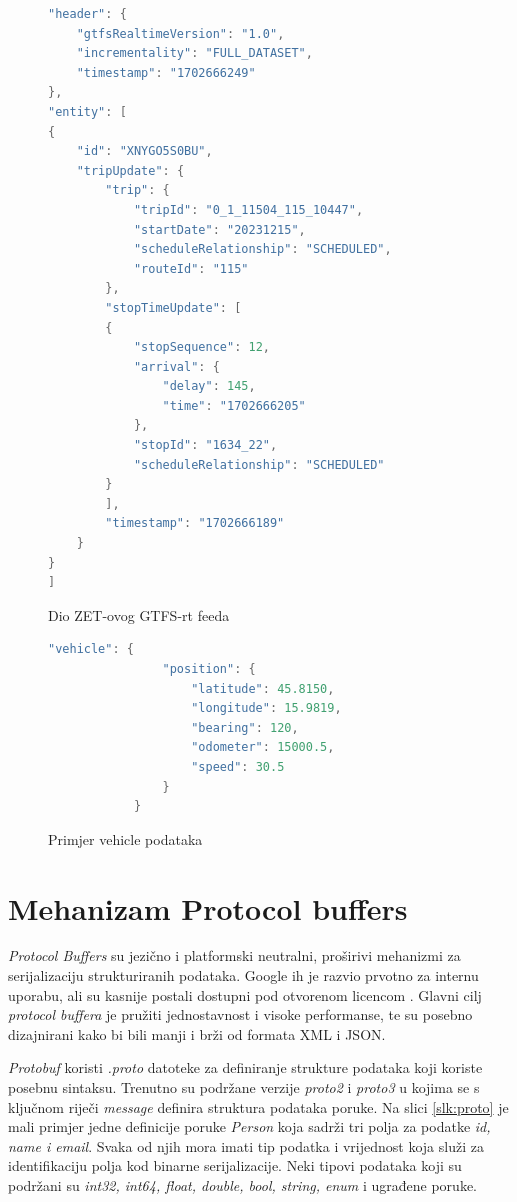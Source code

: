 \documentclass[zavrsnirad]{fer}
\begin{document}
\begin{figure}[H]
	\centering
	

	\begin{minipage}[htb]{0.58\linewidth}
		\centering
		
		\begin{lstlisting}[language=Java]
"header": {
	"gtfsRealtimeVersion": "1.0",
	"incrementality": "FULL_DATASET",
	"timestamp": "1702666249"
},
"entity": [
{
	"id": "XNYGO5S0BU",
	"tripUpdate": {
		"trip": {
			"tripId": "0_1_11504_115_10447",
			"startDate": "20231215",
			"scheduleRelationship": "SCHEDULED",
			"routeId": "115"
		},
		"stopTimeUpdate": [
		{
			"stopSequence": 12,
			"arrival": {
				"delay": 145,
				"time": "1702666205"
			},
			"stopId": "1634_22",
			"scheduleRelationship": "SCHEDULED"
		}
		],
		"timestamp": "1702666189"
	}
}
]
		\end{lstlisting} 
		\caption{Dio ZET-ovog GTFS-rt feeda}
		\label{slk:reply1}
	\end{minipage}
	\hfill
	\begin{minipage}[htb]{0.38\linewidth}
		\centering
		\begin{lstlisting}[language=Java]
			"vehicle": {
				"position": {
					"latitude": 45.8150,
					"longitude": 15.9819,
					"bearing": 120,
					"odometer": 15000.5,
					"speed": 30.5
				}
			}
		\end{lstlisting}
		\caption{Primjer vehicle podataka}
		\label{slk:reply2}
	\end{minipage}
\end{figure}


\newpage
\chapter{Mehanizam Protocol buffers}
\label{sec:protobuf}

\textit{Protocol Buffers} su jezično i platformski neutralni, proširivi mehanizmi za serijalizaciju strukturiranih podataka. Google ih je razvio prvotno za internu uporabu, ali su kasnije postali dostupni pod otvorenom licencom \cite{protobuf}. Glavni cilj \textit{protocol buffera} je pružiti jednostavnost i visoke performanse, te su posebno dizajnirani kako bi bili manji i brži od formata XML i JSON.


\textit{Protobuf} koristi \textit{.proto} datoteke za definiranje strukture podataka koji koriste posebnu sintaksu. Trenutno su podržane verzije \textit{proto2} i \textit{proto3} u kojima se s ključnom riječi \textit{message} definira struktura podataka poruke. Na slici \ref{slk:proto} je mali primjer jedne definicije poruke \textit{Person} koja sadrži tri polja za podatke \textit{id, name i email}. Svaka od njih mora imati tip podatka i vrijednost koja služi za identifikaciju polja kod binarne serijalizacije. Neki tipovi podataka koji su podržani su \textit{int32, int64, float, double, bool, string, enum} i ugrađene poruke.
\end{document}
